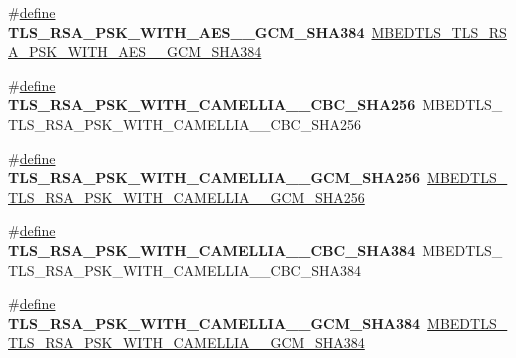 \begin{DoxyCompactItemize}
\item 
\mbox{\label{compat-1_83_8h_a181e844e18eeacf8f90488d5f73ebfb4}} 
\#\hyperlink{structdefine}{define} {\bfseries T\+L\+S\+\_\+\+R\+S\+A\+\_\+\+P\+S\+K\+\_\+\+W\+I\+T\+H\+\_\+\+A\+E\+S\+\_\+\_\+\+G\+C\+M\+\_\+\+S\+H\+A384}~\hyperlink{ssl__ciphersuites_8h_ad98034d6f7ac6779cc51cb6b7435e2d3}{M\+B\+E\+D\+T\+L\+S\+\_\+\+T\+L\+S\+\_\+\+R\+S\+A\+\_\+\+P\+S\+K\+\_\+\+W\+I\+T\+H\+\_\+\+A\+E\+S\+\_\+\_\+\+G\+C\+M\+\_\+\+S\+H\+A384}
\item 
\mbox{\label{compat-1_83_8h_a859b00f29ee536f803970513f2ed6ad0}} 
\#\hyperlink{structdefine}{define} {\bfseries T\+L\+S\+\_\+\+R\+S\+A\+\_\+\+P\+S\+K\+\_\+\+W\+I\+T\+H\+\_\+\+C\+A\+M\+E\+L\+L\+I\+A\+\_\+\_\+\+C\+B\+C\+\_\+\+S\+H\+A256}~M\+B\+E\+D\+T\+L\+S\+\_\+\+T\+L\+S\+\_\+\+R\+S\+A\+\_\+\+P\+S\+K\+\_\+\+W\+I\+T\+H\+\_\+\+C\+A\+M\+E\+L\+L\+I\+A\+\_\+\_\+\+C\+B\+C\+\_\+\+S\+H\+A256
\item 
\mbox{\label{compat-1_83_8h_a581d8a6cbdd0a2f8ef8711332ef2cb10}} 
\#\hyperlink{structdefine}{define} {\bfseries T\+L\+S\+\_\+\+R\+S\+A\+\_\+\+P\+S\+K\+\_\+\+W\+I\+T\+H\+\_\+\+C\+A\+M\+E\+L\+L\+I\+A\+\_\+\_\+\+G\+C\+M\+\_\+\+S\+H\+A256}~\hyperlink{ssl__ciphersuites_8h_a104408aa7e8fc126ea6c98fdd295be0c}{M\+B\+E\+D\+T\+L\+S\+\_\+\+T\+L\+S\+\_\+\+R\+S\+A\+\_\+\+P\+S\+K\+\_\+\+W\+I\+T\+H\+\_\+\+C\+A\+M\+E\+L\+L\+I\+A\+\_\+\_\+\+G\+C\+M\+\_\+\+S\+H\+A256}
\item 
\mbox{\label{compat-1_83_8h_ab14a2a48c1b1b5e82fa8d16d94ac1ac5}} 
\#\hyperlink{structdefine}{define} {\bfseries T\+L\+S\+\_\+\+R\+S\+A\+\_\+\+P\+S\+K\+\_\+\+W\+I\+T\+H\+\_\+\+C\+A\+M\+E\+L\+L\+I\+A\+\_\+\_\+\+C\+B\+C\+\_\+\+S\+H\+A384}~M\+B\+E\+D\+T\+L\+S\+\_\+\+T\+L\+S\+\_\+\+R\+S\+A\+\_\+\+P\+S\+K\+\_\+\+W\+I\+T\+H\+\_\+\+C\+A\+M\+E\+L\+L\+I\+A\+\_\+\_\+\+C\+B\+C\+\_\+\+S\+H\+A384
\item 
\mbox{\label{compat-1_83_8h_a71b445ba0f6cbcf80dae4dddac77f5d6}} 
\#\hyperlink{structdefine}{define} {\bfseries T\+L\+S\+\_\+\+R\+S\+A\+\_\+\+P\+S\+K\+\_\+\+W\+I\+T\+H\+\_\+\+C\+A\+M\+E\+L\+L\+I\+A\+\_\+\_\+\+G\+C\+M\+\_\+\+S\+H\+A384}~\hyperlink{ssl__ciphersuites_8h_ac1b345f9b8bd2c833d948a63f6c61ed1}{M\+B\+E\+D\+T\+L\+S\+\_\+\+T\+L\+S\+\_\+\+R\+S\+A\+\_\+\+P\+S\+K\+\_\+\+W\+I\+T\+H\+\_\+\+C\+A\+M\+E\+L\+L\+I\+A\+\_\+\_\+\+G\+C\+M\+\_\+\+S\+H\+A384}

\end{DoxyCompactItemize}
